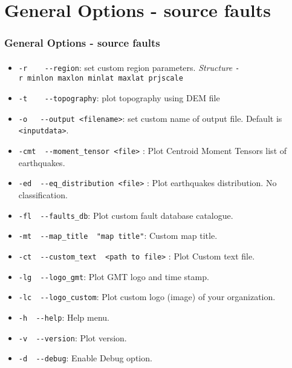 \section[General arg]{General Options - source faults}

\graphicspath{{Chapter4/Figs/Vector/}{Figs/}}
\begin{frame}
  \frametitle{General Options - source faults}
  \framesubtitle{}
  \label{fr4:hist_pics}
\begin{scriptsize}
\begin{itemize}
\item
  \texttt{-r\ \ \ \textbar{}\ -\/-region}: set custom region parameters.
  \emph{Structure} \texttt{-r\ minlon\ maxlon\ minlat\ maxlat\ prjscale}
\item
  \texttt{-t\ \ \ \textbar{}\ -\/-topography}: plot topography using DEM
  file
\item
  \texttt{-o\ \ \textbar{}\ -\/-output\ \textless{}filename\textgreater{}}:
  set custom name of output file. Default is
  \texttt{\textless{}inputdata\textgreater{}}.
\item
  \texttt{-cmt\ \textbar{}\ -\/-moment\_tensor\ \textless{}file\textgreater{}}
  : Plot Centroid Moment Tensors list of earthquakes.
\item
  \texttt{-ed\ \textbar{}\ -\/-eq\_distribution\ \textless{}file\textgreater{}}
  : Plot earthquakes distribution. No classification.
\item
  \texttt{-fl\ \textbar{}\ -\/-faults\_db}: Plot custom fault database
  catalogue.
\item
  \texttt{-mt\ \textbar{}\ -\/-map\_title\ \ "map\ title"}: Custom map
  title.
\item
  \texttt{-ct\ \textbar{}\ -\/-custom\_text\ \ \textless{}path\ to\ file\textgreater{}}
  : Plot Custom text file.
\item
  \texttt{-lg\ \textbar{}\ -\/-logo\_gmt}: Plot GMT logo and time stamp.
\item
  \texttt{-lc\ \textbar{}\ -\/-logo\_custom}: Plot custom logo (image)
  of your organization.
\item
  \texttt{-h\ \textbar{}\ -\/-help}: Help menu.
\item
  \texttt{-v\ \textbar{}\ -\/-version}: Plot version.
\item
  \texttt{-d\ \textbar{}\ -\/-debug}: Enable Debug option.
\end{itemize}
\end{scriptsize}
\end{frame}
\note{}


